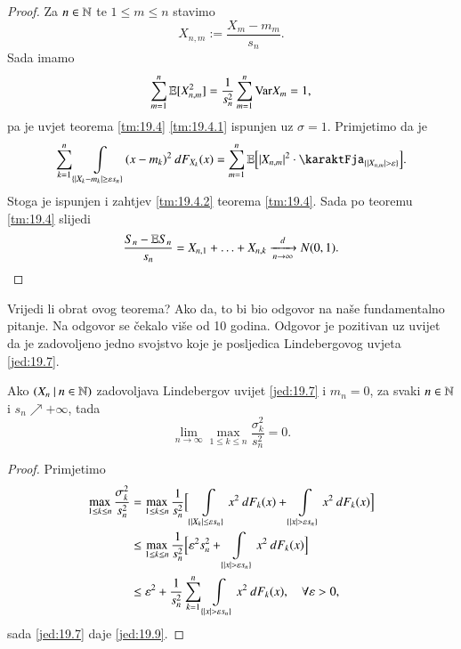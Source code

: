 \begin{proof}
    Za $n \in \mathbb{N}$ te $1 \leq m \leq n$ stavimo
    \begin{equation*}
        X_{n, m} := \frac{X_m - m_m}{s_n}.
    \end{equation*}
    Sada imamo
    \begin{equation*}
        \sum\limits_{m = 1}^{n} \mathbb{E} [X_{n, m}^2] = \frac{1}{s_n^2} \sum\limits_{m = 1}^{n} \mathrm{Var} X_m = 1,
    \end{equation*}
    pa je uvjet teorema \ref{tm:19.4} \ref{tm:19.4.1} ispunjen uz $\sigma = 1$.
    Primjetimo da je
    \begin{equation*}
        \suma{k = 1}{n} \int\limits_{\{|X_k - m_k| \geq \varepsilon s_n\}} (x - m_k)^2 \: d F_{X_k} (x) = \suma{m = 1}{n} \masE \Big[ |X_{n, m}|^2 \cdot \karaktFja_{\{ |X_{n, m}| > \varepsilon \}} \Big].
    \end{equation*}
    Stoga je ispunjen i zahtjev \ref{tm:19.4.2} teorema \ref{tm:19.4}.
    Sada po teoremu \ref{tm:19.4} slijedi
    \begin{equation*}
        \frac{S_n - \mathbb{E} S_n}{s_n} = X_{n, 1} + \ldots + X_{n, k} \xrightarrow[n \to \infty]{d} N(0, 1).
    \end{equation*}
\end{proof}

Vrijedi li obrat ovog teorema?
Ako da, to bi bio odgovor na na\v se fundamentalno pitanje.
Na odgovor se \v cekalo vi\v se od 10 godina.
Odgovor je pozitivan uz uvijet da je zadovoljeno jedno svojstvo koje je posljedica Lindebergovog uvjeta \eqref{jed:19.7}.

\begin{lm}  \label{lm:19.8}
    Ako $({X_n} \: | \: {n \in \mathbb{N}})$ zadovoljava Lindebergov uvijet \eqref{jed:19.7} i $m_n = 0$, za svaki $n \in \mathbb{N}$ i $s_n \nearrow +\infty$, tada
    \begin{equation}    \label{jed:19.9}
        \lim\limits_{n \to \infty} \max\limits_{1 \leq k \leq n} \frac{\sigma_k^2}{s_n^2} = 0.
    \end{equation}
\end{lm}

\begin{proof}
    Primjetimo
    \begin{equation*}
        \begin{aligned}
            \max\limits_{1 \leq k \leq n} \frac{\sigma_k^2}{s_n^2} &= \max\limits_{1 \leq k \leq n} \frac{1}{s_n^2} \Big[ \int\limits_{\{ |X_k|\leq \varepsilon s_n \}} x^2 \: d F_k (x) + \int\limits_{\{ |x| > \varepsilon s_n \}} x^2 \: d F_k (x) \Big]\\
            &\leq \max\limits_{1 \leq k \leq n} \frac{1}{s_n^2} \Big[ \varepsilon^2 s_n^2 + \int\limits_{\{ |x| > \varepsilon s_n \}} x^2 \: d F_k (x) \Big]\\
            &\leq \varepsilon^2 + \frac{1}{s_n^2} \sum\limits_{k = 1}^{n} \int\limits_{\{ |x| > \varepsilon s_n \}} x^2 \: d F_k (x), \quad \forall \varepsilon > 0,
        \end{aligned}
    \end{equation*}
    sada \eqref{jed:19.7} daje \eqref{jed:19.9}.
\end{proof}

